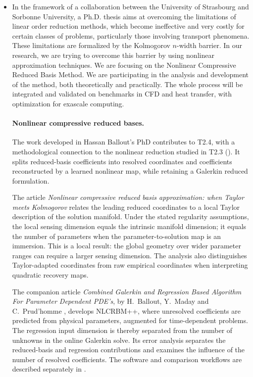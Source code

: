 \begin{itemize}
  (). The work was presented at the
  Congrès National d'Analyse Numérique (CANUM 2026), in a minisymposium
  on machine learning for the numerical solution of partial differential
  equations organised by Rémy Hos\-sein\-khan-Bou\-cher.
\item[T2.4] In the framework of a collaboration between the University
  of  Strasbourg  and Sorbonne  University,  a  Ph.D. thesis  aims  at
  overcoming the limitations of  linear order reduction methods, which
  become ineffective and very costly  for certain classes of problems,
  particularly those involving transport phenomena.  These limitations
  are  formalized  by  the   Kolmogorov  $n$-width  barrier.   In  our
  research, we are trying to  overcome this barrier by using nonlinear
  approximation  techniques.    We  are  focusing  on   the  Nonlinear
  Compressive  Reduced  Basis Method.   We  are  participating in  the
  analysis  and  development of  the  method,  both theoretically  and
  practically. The whole  process will be integrated  and validated on
  benchmarks in CFD and heat  transfer, with optimization for exascale
  computing.
\paragraph{Nonlinear compressive reduced bases.}
  The work developed in Hassan Ballout's PhD contributes to T2.4, with a
  methodological connection to the nonlinear reduction studied in T2.3
  (). It splits reduced-basis coefficients
  into resolved coordinates and coefficients reconstructed by a learned
  nonlinear map, while retaining a Galerkin reduced formulation.

  The article \emph{Nonlinear compressive reduced basis approximation:
  when Taylor meets Kolmogorov} \cite{hal_05466017} relates the leading
  reduced coordinates to a local Taylor description of the solution
  manifold. Under the stated regularity assumptions, the local sensing
  dimension equals the intrinsic manifold dimension; it equals the number
  of parameters when the parameter-to-solution map is an immersion.
  This is a local result: the global geometry over wider parameter ranges
  can require a larger sensing dimension. The analysis also distinguishes
  Taylor-adapted coordinates from raw empirical coordinates when interpreting
  quadratic recovery maps.

  The companion article \emph{Combined Galerkin and Regression Based
  Algorithm For Parameter Dependent PDE's}, by H.~Ballout, Y.~Maday and
  C.~Prud'homme \cite{hal_05143191}, develops NLCRBM++, where unresolved coefficients are
  predicted from physical parameters, augmented for time-dependent problems.
  The regression input dimension is thereby separated from the number of
  unknowns in the online Galerkin solve. Its error analysis separates the
  reduced-basis and regression contributions and examines the influence
  of the number of resolved coefficients. The software and comparison
  workflows are described separately in
  .


\end{itemize}
